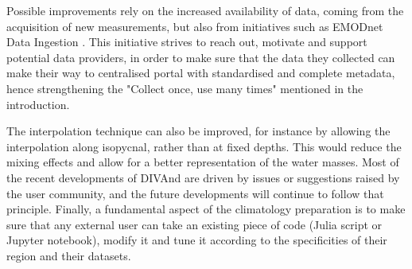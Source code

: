 \documentclass[essd, manuscript]{copernicus}
\begin{document}
Possible improvements rely on the increased availability of data, coming from the acquisition of new measurements, but also from initiatives such as EMODnet Data Ingestion \citep{IONA2024}. This initiative strives to reach out, motivate and support potential data providers, in order to make sure that the data they collected can make their way to centralised portal with standardised and complete metadata, hence strengthening the "Collect once, use many times" mentioned in the introduction. 

The interpolation technique can also be improved, for instance by allowing the interpolation along isopycnal, rather than at fixed depths. This would reduce the mixing effects and allow for a better representation of the water masses. Most of the recent developments of DIVAnd are driven by issues or suggestions raised by the user community, and the future developments will continue to follow that principle. Finally, a fundamental aspect of the climatology preparation is to make sure that any external user can take an existing piece of code (Julia script or Jupyter notebook), modify it and tune it according to the specificities of their region and their datasets. 
\end{document}
